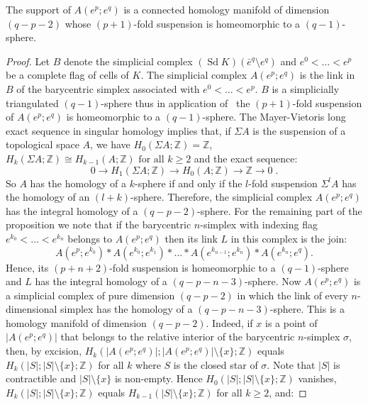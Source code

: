 \documentclass[AHL,Unicode,longabstracts,published]{cedram}
\newcommand{\Z}{\mathbb{Z}}
\DeclareMathOperator{\Sd}{Sd}
\begin{document}
\begin{prop}\label{prp:A_homo}
The support of $A(e^p;e^q)$ is a connected homology manifold of dimension $(q-p-2)$ whose $(p+1)$-fold suspension is homeomorphic to a $(q-1)$-sphere.
\end{prop}

\begin{proof}
Let $B$ denote the simplicial complex $(\Sd K)(\bar{e}^q\setminus e^q)$ and $e^0<\dots<e^p$ be a complete flag of cells of $K$. The simplicial complex $A(e^p;e^q)$ is the link in $B$ of the barycentric simplex associated with $e^0<\dots<e^p$. $B$ is a simplicially triangulated $(q-1)$-sphere thus in application of~\cite[Proposition~1.3 p.~5]{Gal-Ste_Cla_Sim} the $(p+1)$-fold suspension of $A(e^p;e^q)$ is homeomorphic to a $(q-1)$-sphere. The Mayer-Vietoris long exact sequence in singular homology implies that, if $\Sigma A$ is the suspension of a topological space $A$, we have $H_0(\Sigma A;\Z)=\Z$, $H_{k}(\Sigma A;\Z)\cong H_{k-1}(A;\Z) \text{ for all }k\geq 2$ and the exact sequence:
\begin{equation*}
0 \rightarrow H_1(\Sigma A;\Z) \rightarrow H_0(A;\Z) \rightarrow \Z \rightarrow 0\;.
\end{equation*}
So $A$ has the homology of a $k$-sphere if and only if the $l$-fold suspension $\Sigma^l A$ has the homology of an $(l+k)$-sphere. Therefore, the simplicial complex $A(e^p;e^q)$ has the integral homology of a $(q-p-2)$-sphere. For the remaining part of the proposition we note that if the barycentric $n$-simplex with indexing flag $e^{k_0}<\dots<e^{k_{n}}$ belongs to $A(e^p;e^q)$ then its link $L$ in this complex is the join:
\begin{equation*}
A\left(e^p;e^{k_0}\right)*A\left(e^{k_0};e^{k_1}\right)*\dots*A\left(e^{k_{n-1}};e^{k_n}\right)*A\left(e^{k_n};e^{q}\right).
\end{equation*}
Hence, its $(p+n+2)$-fold suspension is homeomorphic to a $(q-1)$-sphere and $L$ has the integral homology of a $(q-p-n-3)$-sphere. Now $A(e^p;e^q)$ is a simplicial complex of pure dimension $(q-p-2)$ in which the link of every $n$-dimensional simplex has the homology of a $(q-p-n-3)$-sphere. This is a homology manifold of dimension $(q-p-2)$. Indeed, if $x$ is a point of $|A(e^p;e^q)|$ that belongs to the relative interior of the barycentric $n$-simplex $\sigma$, then, by excision, $H_k(|A(e^p;e^q)|;|A(e^p;e^q)|\setminus\{x\};\Z)$ equals $H_k(|S|;|S|\setminus\{x\};\Z)$ for all $k$ where $S$ is the closed star of $\sigma$. Note that $|S|$ is contractible and $|S|\setminus\{x\}$ is non-empty. Hence $H_0(|S|;|S|\setminus\{x\};\Z)$ vanishes, $H_k(|S|;|S|\setminus\{x\};\Z)$ equals $H_{k-1}(|S|\setminus\{x\};\Z)$ for all $k\geq2$, and:

\end{proof}
\end{document}
